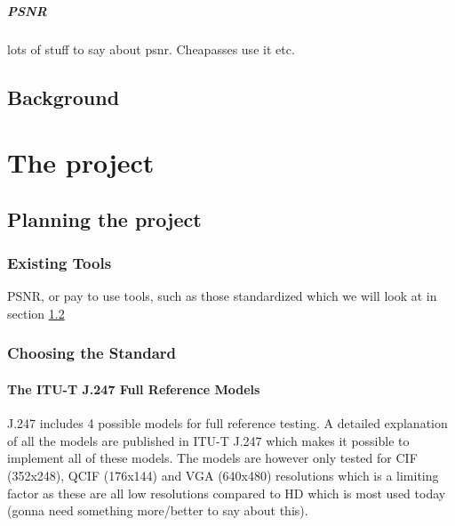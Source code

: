 \subsubsection{PSNR}\label{sect:related work psnr}
	lots of stuff to say about psnr. Cheapasses use it etc.

\chapter{Background}                  


\part{The project}                   

\chapter{Planning the project} 

\section{Existing Tools}
PSNR, or pay to use tools, such as those standardized which we will look at in section \ref{sect:choosing the standard}

\section{Choosing the Standard}\label{sect:choosing the standard}

\subsection{The ITU-T J.247 Full Reference Models}
J.247 includes 4 possible models for full reference testing. A detailed explanation of all the models are published in ITU-T J.247 which makes it possible to implement all of these models. The models are however only tested for CIF (352x248), QCIF (176x144) and VGA (640x480) resolutions which is a limiting factor as these are all low resolutions compared to HD which is most used today (gonna need something more/better to say about this).

